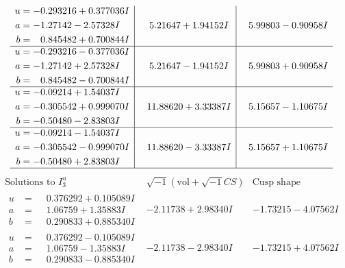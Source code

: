 \documentclass[1p]{elsarticle_modified}
\theoremstyle{definition}
\newcommand{\I}{\sqrt{-1}}
\begin{document}
$$\begin{array}{c|c|c}
\begin{aligned}
u &= -0.293216 + 0.377036 I \\
a &= -1.27142 - 2.57328 I \\
b &= \phantom{-}0.845482 + 0.700844 I\end{aligned}
 & \phantom{-}5.21647 + 1.94152 I & \phantom{-}5.99803 - 0.90958 I \\ \hline\begin{aligned}
u &= -0.293216 - 0.377036 I \\
a &= -1.27142 + 2.57328 I \\
b &= \phantom{-}0.845482 - 0.700844 I\end{aligned}
 & \phantom{-}5.21647 - 1.94152 I & \phantom{-}5.99803 + 0.90958 I \\ \hline\begin{aligned}
u &= -0.09214 + 1.54037 I \\
a &= -0.305542 + 0.999070 I \\
b &= -0.50480 - 2.83803 I\end{aligned}
 & \phantom{-}11.88620 + 3.33387 I & \phantom{-}5.15657 - 1.10675 I \\ \hline\begin{aligned}
u &= -0.09214 - 1.54037 I \\
a &= -0.305542 - 0.999070 I \\
b &= -0.50480 + 2.83803 I\end{aligned}
 & \phantom{-}11.88620 - 3.33387 I & \phantom{-}5.15657 + 1.10675 I\\
 \hline 
 \end{array}$$\newpage$$\begin{array}{c|c|c}  
\text{Solutions to }I^u_{3}& \I (\text{vol} + \sqrt{-1}CS) & \text{Cusp shape}\\
 \hline 
\begin{aligned}
u &= \phantom{-}0.376292 + 0.105089 I \\
a &= \phantom{-}1.06759 + 1.35883 I \\
b &= \phantom{-}0.290833 + 0.885340 I\end{aligned}
 & -2.11738 + 2.98340 I & -1.73215 - 4.07562 I \\ \hline\begin{aligned}
u &= \phantom{-}0.376292 - 0.105089 I \\
a &= \phantom{-}1.06759 - 1.35883 I \\
b &= \phantom{-}0.290833 - 0.885340 I\end{aligned}
 & -2.11738 - 2.98340 I & -1.73215 + 4.07562 I \\ \hline\begin{aligned}

\end{aligned}
\end{array}$$
\end{document}
